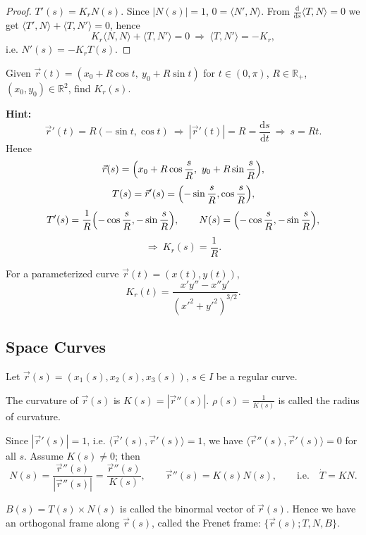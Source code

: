 \begin{proof}
$T'(s)=K_rN(s)$. Since $|N(s)|=1$, $0=\langle N',N\rangle$. From $\frac{\mathrm d}{\mathrm ds}\langle T,N\rangle=0$ we get $\langle T',N\rangle+\langle T,N'\rangle=0$, hence
\[
  K_r\langle N,N\rangle+\langle T,N'\rangle=0
  \ \Longrightarrow\
  \langle T,N'\rangle=-K_r,
\]
i.e. $N'(s)=-K_rT(s)$.
\end{proof}

\begin{example}\label{ex:circle-curvature}
Given $\vec r(t)=(x_0+R\cos t,\ y_0+R\sin t)$ for $t\in(0,\pi)$, $R\in\mathbb{R}_+$, $(x_0,y_0)\in\mathbb{R}^2$, find $K_r(s)$.

\textbf{Hint:}
\[
  \vec r'(t)=R(-\sin t,\cos t)
  \ \Longrightarrow\
  |\vec r'(t)|=R=\frac{\mathrm ds}{\mathrm dt}
  \ \Longrightarrow\
  s=Rt.
\]
Hence
\[
  \vec r(s)=\Bigl(x_0+R\cos\frac{s}{R},\ y_0+R\sin\frac{s}{R}\Bigr),
\]
\[
  T(s)=\vec r'(s)=\Bigl(-\sin\frac{s}{R},\cos\frac{s}{R}\Bigr),
\]
\[
  T'(s)=\frac1R\Bigl(-\cos\frac{s}{R},-\sin\frac{s}{R}\Bigr),\qquad
  N(s)=\Bigl(-\cos\frac{s}{R},-\sin\frac{s}{R}\Bigr),
\]
\[
  \Longrightarrow\ K_r(s)=\frac1R.
\]
\end{example}

\begin{example}\label{ex:curvature-parametrized}
For a parameterized curve $\vec r(t)=(x(t),y(t))$,
\[
  K_r(t)=\frac{x'y''-x''y'}{(x'^2+y'^2)^{3/2}}.
\]
\end{example}

\subsection{Space Curves}

Let $\vec r(s)=(x_1(s),x_2(s),x_3(s))$, $s\in I$ be a regular curve.

\begin{definition}\label{def:curvature}
The curvature of $\vec r(s)$ is $K(s)=|\vec r''(s)|$. $\rho(s)=\frac{1}{K(s)}$ is called the radius of curvature.
\end{definition}

Since $|\vec r'(s)|=1$, i.e. $\langle\vec r'(s),\vec r'(s)\rangle=1$, we have $\langle\vec r''(s),\vec r'(s)\rangle=0$ for all $s$. Assume $K(s)\neq0$; then
\[
  N(s)=\frac{\vec r''(s)}{|\vec r''(s)|}=\frac{\vec r''(s)}{K(s)},
  \qquad
  \vec r''(s)=K(s)N(s),
  \qquad\text{i.e.}\quad \dot T=KN.
\]

\begin{definition}\label{def:binormal}
$B(s)=T(s)\times N(s)$ is called the binormal vector of $\vec r(s)$. Hence we have an orthogonal frame along $\vec r(s)$, called the Frenet frame: $\{\vec r(s);T,N,B\}$.
\end{definition}

